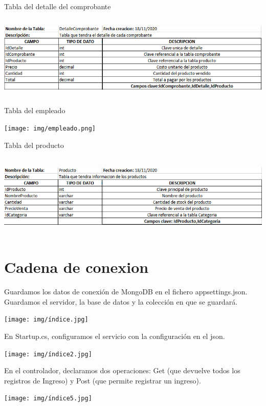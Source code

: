 \documentclass[12pt,letterpaper]{article}
\begin{document}
Tabla del detalle del comprobante
\begin{center}
    \includegraphics[width=14cm, height=4cm]{img/detalle.png}  
\end{center}
Tabla del empleado
\begin{center}
    \texttt{[image: img/empleado.png]}  
\end{center}
\newpage
Tabla del producto
\begin{center}
    \includegraphics[width=14cm, height=4cm]{img/producto.png}  
\end{center}

\section{Cadena de conexion }

Guardamos los datos de conexión de MongoDB en el fichero appsettings.json. Guardamos el servidor, la base de datos y la colección en que se guardará.

\begin{center}
    \texttt{[image: img/índice.jpg]}  
\end{center}

En Startup.cs, configuramos el servicio con la configuración en el json.

\begin{center}
    \texttt{[image: img/índice2.jpg]}  
\end{center}

En el controlador, declaramos dos operaciones: Get (que devuelve todos los registros de Ingreso) y Post (que permite registrar un ingreso).

\begin{center}
    \texttt{[image: img/índice5.jpg]}  
\end{center}
\end{document}
